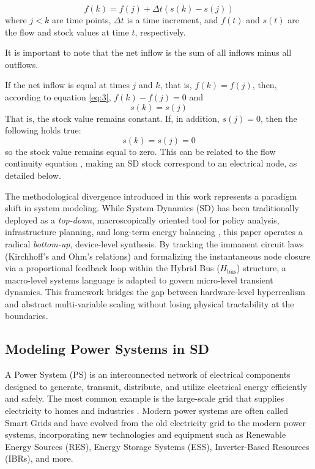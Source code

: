 \documentclass[energies,accept,oneauthor,pdftex]{Definitions/mdpi}
\begin{document}
\begin{equation}
	f(k) = f(j) + \Delta t(s(k) - s(j))
	\label{eq:3}
\end{equation}
where $j < k$ are time points, $\Delta t$ is a time increment, and $f(t)$ and $s(t)$ are the flow and stock values at time $t$, respectively.

It is important to note that the net inflow is the sum of all inflows minus all outflows.

If the net inflow is equal at times $j$ and $k$, that is, $f(k) = f(j)$, then, according to equation \ref{eq:3}, $f(k) - f(j) = 0$ and
\begin{equation}
	s(k) = s(j)
	\label{eq:4}
\end{equation}
That is, the stock value remains constant. If, in addition, $s(j) = 0$, then the following holds true:
\begin{equation}
	s(k) = s(j) = 0
	\label{eq:5}
\end{equation}
so the stock value remains equal to zero. This can be related to the flow continuity equation \cite{Euler1757}, making an SD stock correspond to an electrical node, as detailed below.

The methodological divergence introduced in this work represents a paradigm shift in system modeling. While System Dynamics (SD) has been traditionally deployed as a \textit{top-down}, macroscopically oriented tool for policy analysis, infrastructure planning, and long-term energy balancing \cite{pr13092969, sys12040109}, this paper operates a radical \textit{bottom-up}, device-level synthesis. By tracking the immanent circuit laws (Kirchhoff's and Ohm's relations) and formalizing the instantaneous node closure via a proportional feedback loop within the Hybrid Bus ($H_{\text{bus}}$) structure, a macro-level systems language is adapted to govern micro-level transient dynamics.  This framework bridges the gap between hardware-level hyperrealism and abstract multi-variable scaling without losing physical tractability at the boundaries.



\subsection{Modeling Power Systems in SD}

A Power System (PS) is an interconnected network of electrical components designed to generate, transmit, distribute, and utilize electrical energy efficiently and safely. The most common example is the large-scale grid that supplies electricity to homes and industries  \cite{Glover2012}. Modern power systems are often called Smart Grids and have evolved from the old electricity grid to the modern power systems, incorporating new technologies and equipment such as Renewable Energy Sources (RES), Energy Storage Systems (ESS), Inverter-Based Resources (IBRs), and more.
\end{document}
